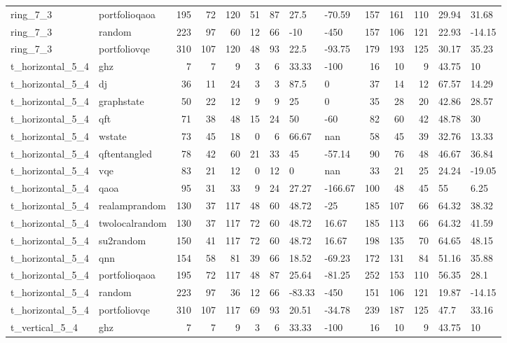 \begin{longtable}{llrrrrrllrrrll}
ring\_7\_3 & portfolioqaoa & 195 & 72 & 120 & 51 & 87 & 27.5 & -70.59 & 157 & 161 & 110 & 29.94 & 31.68 \\
ring\_7\_3 & random & 223 & 97 & 60 & 12 & 66 & -10 & -450 & 157 & 106 & 121 & 22.93 & -14.15 \\
ring\_7\_3 & portfoliovqe & 310 & 107 & 120 & 48 & 93 & 22.5 & -93.75 & 179 & 193 & 125 & 30.17 & 35.23 \\
t\_horizontal\_5\_4 & ghz & 7 & 7 & 9 & 3 & 6 & 33.33 & -100 & 16 & 10 & 9 & 43.75 & 10 \\
t\_horizontal\_5\_4 & dj & 36 & 11 & 24 & 3 & 3 & 87.5 & 0 & 37 & 14 & 12 & 67.57 & 14.29 \\
t\_horizontal\_5\_4 & graphstate & 50 & 22 & 12 & 9 & 9 & 25 & 0 & 35 & 28 & 20 & 42.86 & 28.57 \\
t\_horizontal\_5\_4 & qft & 71 & 38 & 48 & 15 & 24 & 50 & -60 & 82 & 60 & 42 & 48.78 & 30 \\
t\_horizontal\_5\_4 & wstate & 73 & 45 & 18 & 0 & 6 & 66.67 & nan & 58 & 45 & 39 & 32.76 & 13.33 \\
t\_horizontal\_5\_4 & qftentangled & 78 & 42 & 60 & 21 & 33 & 45 & -57.14 & 90 & 76 & 48 & 46.67 & 36.84 \\
t\_horizontal\_5\_4 & vqe & 83 & 21 & 12 & 0 & 12 & 0 & nan & 33 & 21 & 25 & 24.24 & -19.05 \\
t\_horizontal\_5\_4 & qaoa & 95 & 31 & 33 & 9 & 24 & 27.27 & -166.67 & 100 & 48 & 45 & 55 & 6.25 \\
t\_horizontal\_5\_4 & realamprandom & 130 & 37 & 117 & 48 & 60 & 48.72 & -25 & 185 & 107 & 66 & 64.32 & 38.32 \\
t\_horizontal\_5\_4 & twolocalrandom & 130 & 37 & 117 & 72 & 60 & 48.72 & 16.67 & 185 & 113 & 66 & 64.32 & 41.59 \\
t\_horizontal\_5\_4 & su2random & 150 & 41 & 117 & 72 & 60 & 48.72 & 16.67 & 198 & 135 & 70 & 64.65 & 48.15 \\
t\_horizontal\_5\_4 & qnn & 154 & 58 & 81 & 39 & 66 & 18.52 & -69.23 & 172 & 131 & 84 & 51.16 & 35.88 \\
t\_horizontal\_5\_4 & portfolioqaoa & 195 & 72 & 117 & 48 & 87 & 25.64 & -81.25 & 252 & 153 & 110 & 56.35 & 28.1 \\
t\_horizontal\_5\_4 & random & 223 & 97 & 36 & 12 & 66 & -83.33 & -450 & 151 & 106 & 121 & 19.87 & -14.15 \\
t\_horizontal\_5\_4 & portfoliovqe & 310 & 107 & 117 & 69 & 93 & 20.51 & -34.78 & 239 & 187 & 125 & 47.7 & 33.16 \\
t\_vertical\_5\_4 & ghz & 7 & 7 & 9 & 3 & 6 & 33.33 & -100 & 16 & 10 & 9 & 43.75 & 10 \\

\end{longtable}
